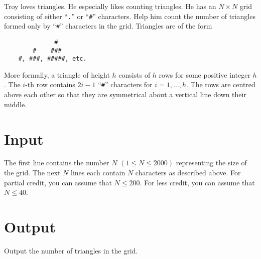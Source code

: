 Troy loves triangles. He especially likes counting triangles. He has an $N \times N$ grid consisting
of either ``\verb+.+'' or ``\verb+#+'' characters. Help him count the number of triangles formed only by ``\verb+#+''
characters in the grid. Triangles are of the form
\begin{verbatim}
              #
        #    ###
    #, ###, #####, etc.
\end{verbatim}

More formally, a triangle of height $h$ consists of $h$ rows for some positive integer $h$. The $i$-th row contains $2i-1$ ``\verb+#+'' characters for $i = 1,\ldots,h$. The rows are centred above each other so that they are symmetrical about a vertical line down their middle.


\section*{Input}
The first line contains the number $N$ $(1 \leq N \leq 2000)$ representing the size of the grid. The
next $N$ lines each contain $N$ characters as described above. For partial credit, you can assume that
$N \leq 200$. For less credit, you can assume that $N \leq 40$.

\section*{Output}
Output the number of triangles in the grid.
